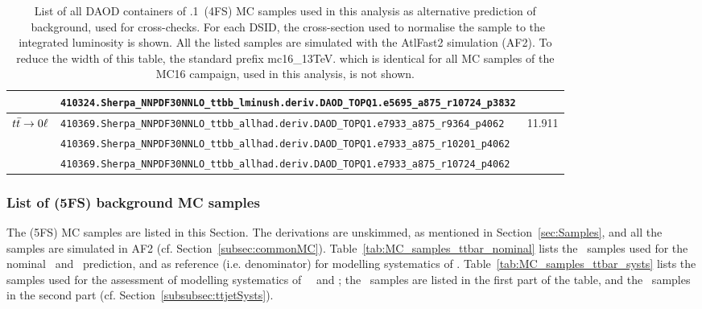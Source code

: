 \begin{table}[htbp]
{\begin{tabular}{l|l|r}
                                                 & \verb|410324.Sherpa_NNPDF30NNLO_ttbb_lminush.deriv.DAOD_TOPQ1.e5695_a875_r10724_p3832|     &  \\ \hline
\multirow{3}{*}{$t\bar{t}\to\mathrm{0\ell}$}       & \verb|410369.Sherpa_NNPDF30NNLO_ttbb_allhad.deriv.DAOD_TOPQ1.e7933_a875_r9364_p4062|       & \multirow{3}{*}{11.911} \\
                                                 & \verb|410369.Sherpa_NNPDF30NNLO_ttbb_allhad.deriv.DAOD_TOPQ1.e7933_a875_r10201_p4062|      &  \\
                                                 & \verb|410369.Sherpa_NNPDF30NNLO_ttbb_allhad.deriv.DAOD_TOPQ1.e7933_a875_r10724_p4062|      &  \\ \hline
\bottomrule
\end{tabular}}
  \caption{
    List of all DAOD containers of .1~\ttbbMC(4FS) MC samples used in this analysis as alternative prediction of \ttbin\ background, used for cross-checks.
    For each DSID, the cross-section used to normalise the sample to the integrated luminosity is shown.
    All the listed samples are simulated with the AtlFast2 simulation (AF2).
    To reduce the width of this table, the standard prefix \textsf{mc16\_13TeV.} which is identical for all MC samples of the MC16 campaign, used in this analysis, is not shown.
  }
  \label{tab:MC_samples_ttbb_alt}
\end{table}


\subsubsection{List of \texorpdfstring{\ttbar(5FS)}{ttbar(5FS)} background MC samples}
\label{subsubsec:MC_samples_ttbar}

The \ttbar(5FS) MC samples are listed in this Section.
The derivations are unskimmed, as mentioned in Section~\ref{sec:Samples}, and all the samples are simulated in AF2 (cf. Section~\ref{subsec:commonMC}).
Table~\ref{tab:MC_samples_ttbar_nominal} lists the \PowPyttbar\ samples used for the nominal \ttcin\ and \ttlight\ prediction,
and as reference (i.e. denominator) for modelling systematics of \ttbin.
Table~\ref{tab:MC_samples_ttbar_systs} lists the samples used for the assessment of modelling systematics of \ttbin\, \ttcin\, and \ttlight;
the \PowHwttbar\ samples are listed in the first part of the table, and the \aMCPyttbar\ samples in the second part (cf. Section~\ref{subsubsec:ttjetSysts}).

